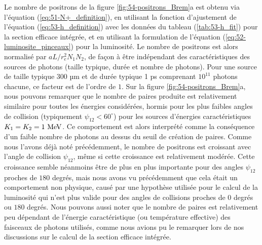 \begin{refsection}
Le nombre de positrons de la figure \ref{fig:54-positrons_Brem}a est obtenu via l'équation (\ref{eq:51-N+_definition}), en utilisant la fonction d'ajustement de l'équation (\ref{eq:53-h_definition}) avec les données du tableau (\ref{tab:53-h_fit}) pour la section efficace intégrée, et en utilisant la formulation de l'équation (\ref{eq:52-luminosite_pinceaux}) pour la luminosité. Le nombre de positrons est alors normalisé par $aL/r_e^2 N_1 N_2$, de façon à être indépendant des caractéristiques des sources de photons (taille typique, durée et nombre de photons). Pour une source de taille typique 300 µm \parencite{glinec_2005} et de durée typique 1 ps comprenant $10^{11}$ photons chacune, ce facteur est de l'ordre de $1$. Sur la figure \ref{fig:54-positrons_Brem}a, nous pouvons remarquer que le nombre de paires produite est relativement similaire pour toutes les énergies considérées, hormis pour les plus faibles angles de collision (typiquement $\psi_{12}<60^\circ$) pour les sources d'énergies caractéristiques $K_1=K_2=1 ~ \rm MeV$. Ce comportement est alors interprété comme la conséquence d'un faible nombre de photons au dessus du seuil de création de paires. Comme nous l'avons déjà noté précédemment, le nombre de positrons est croissant avec l'angle de collision $\psi_{12}$, même si cette croissance est relativement modérée. Cette croissance semble néanmoins être de plus en plus importante pour des angles $\psi_{12}$ proches de $180$ degrés, mais nous avons vu précédemment que cela était un comportement non physique, causé par une hypothèse utilisée pour le calcul de la luminosité qui n'est plus valide pour des angles de collisions proches de $0$ degrés ou $180$ degrés. Nous pouvons aussi noter que le nombre de paires est relativement peu dépendant de l'énergie caractéristique (ou température effective) des faisceaux de photons utilisés, comme nous avions pu le remarquer lors de nos discussions sur le calcul de la section efficace intégrée.


\end{refsection}
